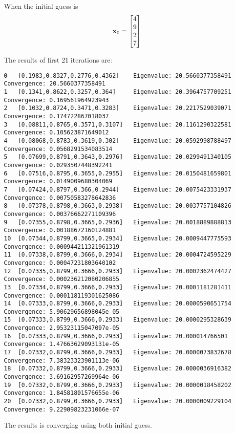\documentclass{article}
\begin{document}
When the initial guess is 
\begin{align}
\boldsymbol{\mathrm{x}}_0=\begin{bmatrix} 4 \\ 9 \\ 2\\ 7 \end{bmatrix}
\end{align}

The results of first 21 iterations are: 
\begin{verbatim}
0	[0.1983,0.8327,0.2776,0.4362]	 Eigenvalue: 20.5660377358491	 Convergence: 20.5660377358491
1	[0.1341,0.8622,0.3257,0.364]	 Eigenvalue: 20.3964757709251	 Convergence: 0.169561964923943
2	[0.1032,0.8724,0.3471,0.3283]	 Eigenvalue: 20.2217529039071	 Convergence: 0.174722867018037
3	[0.08811,0.8765,0.3571,0.3107]	 Eigenvalue: 20.1161290322581	 Convergence: 0.105623871649012
4	[0.08068,0.8783,0.3619,0.302]	 Eigenvalue: 20.0592998788497	 Convergence: 0.0568291534083514
5	[0.07699,0.8791,0.3643,0.2976]	 Eigenvalue: 20.0299491340105	 Convergence: 0.0293507448392241
6	[0.07516,0.8795,0.3655,0.2955]	 Eigenvalue: 20.0150481659801	 Convergence: 0.0149009680304069
7	[0.07424,0.8797,0.366,0.2944]	 Eigenvalue: 20.0075423331937	 Convergence: 0.00750583278642836
8	[0.07378,0.8798,0.3663,0.2938]	 Eigenvalue: 20.0037757104826	 Convergence: 0.00376662271109396
9	[0.07355,0.8798,0.3665,0.2936]	 Eigenvalue: 20.0018889888813	 Convergence: 0.00188672160124881
10	[0.07344,0.8799,0.3665,0.2934]	 Eigenvalue: 20.0009447775593	 Convergence: 0.000944211321961319
11	[0.07338,0.8799,0.3666,0.2934]	 Eigenvalue: 20.0004724595229	 Convergence: 0.00047231803640102
12	[0.07335,0.8799,0.3666,0.2933]	 Eigenvalue: 20.0002362474427	 Convergence: 0.000236212080206855
13	[0.07334,0.8799,0.3666,0.2933]	 Eigenvalue: 20.0001181281411	 Convergence: 0.000118119301625086
14	[0.07333,0.8799,0.3666,0.2933]	 Eigenvalue: 20.0000590651754	 Convergence: 5.90629656898045e-05
15	[0.07333,0.8799,0.3666,0.2933]	 Eigenvalue: 20.0000295328639	 Convergence: 2.95323115047097e-05
16	[0.07333,0.8799,0.3666,0.2933]	 Eigenvalue: 20.000014766501	 Convergence: 1.47663629093131e-05
17	[0.07332,0.8799,0.3666,0.2933]	 Eigenvalue: 20.0000073832678	 Convergence: 7.38323323901113e-06
18	[0.07332,0.8799,0.3666,0.2933]	 Eigenvalue: 20.0000036916382	 Convergence: 3.69162957269964e-06
19	[0.07332,0.8799,0.3666,0.2933]	 Eigenvalue: 20.0000018458202	 Convergence: 1.84581801576655e-06
20	[0.07332,0.8799,0.3666,0.2933]	 Eigenvalue: 20.0000009229104	 Convergence: 9.22909823231066e-07
\end{verbatim}
The results is converging using both initial guess. 
\\
\hypertarget{problem_0_homework_checklist_2}{}
\end{document}
